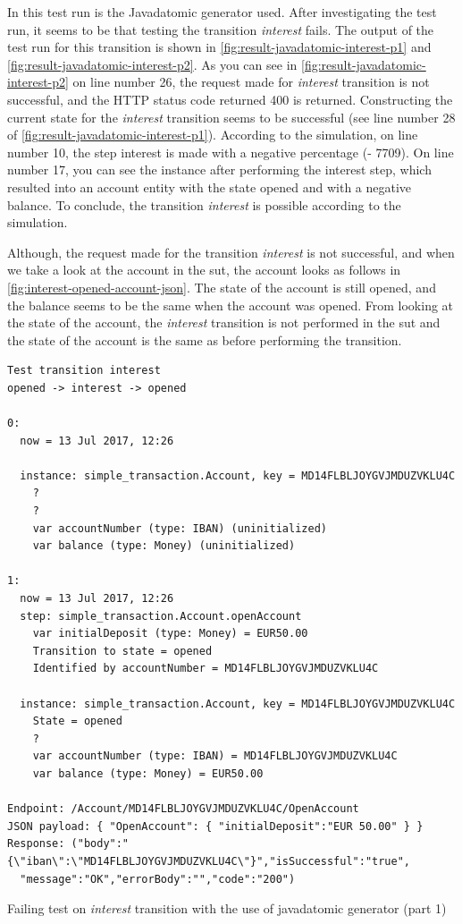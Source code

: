 In this test run is the Javadatomic generator used. After investigating the test
run, it seems to be that testing the transition \textit{interest} fails.
The output of the test run for this transition is shown in
\autoref{fig:result-javadatomic-interest-p1} and \autoref{fig:result-javadatomic-interest-p2}.
As you can see in \autoref{fig:result-javadatomic-interest-p2} on line number 26, the request made
for \textit{interest} transition is not successful, and the HTTP status code returned 400
is returned. Constructing the current state for the \textit{interest} transition seems to
be successful (see line number 28 of \autoref{fig:result-javadatomic-interest-p1}).
According to the simulation, on line number
10, the step interest is made with a negative percentage (- 7709). On line
number 17, you can see the instance after performing the interest step, which
resulted into an account entity with the state opened and with a negative
balance. To conclude, the transition \textit{interest} is possible according to the
simulation.

Although, the request made for the transition \textit{interest} is not
successful, and when we take a look at the account in the \gls{sut}, the account looks
as follows in \autoref{fig:interest-opened-account-json}. The state of the
account is still opened, and the balance seems to be the same when the account
was opened. From looking at the state of the account, the \textit{interest} transition
is not performed in the \gls{sut} and the state of the account is the same as before
performing the transition.


\begin{sourcecode}[h!]
\begin{lstlisting}[]
Test transition interest
opened -> interest -> opened

0:
  now = 13 Jul 2017, 12:26

  instance: simple_transaction.Account, key = MD14FLBLJOYGVJMDUZVKLU4C
    ?
    ?
    var accountNumber (type: IBAN) (uninitialized)
    var balance (type: Money) (uninitialized)

1:
  now = 13 Jul 2017, 12:26
  step: simple_transaction.Account.openAccount
    var initialDeposit (type: Money) = EUR50.00
    Transition to state = opened
    Identified by accountNumber = MD14FLBLJOYGVJMDUZVKLU4C

  instance: simple_transaction.Account, key = MD14FLBLJOYGVJMDUZVKLU4C
    State = opened
    ?
    var accountNumber (type: IBAN) = MD14FLBLJOYGVJMDUZVKLU4C
    var balance (type: Money) = EUR50.00

Endpoint: /Account/MD14FLBLJOYGVJMDUZVKLU4C/OpenAccount
JSON payload: { "OpenAccount": { "initialDeposit":"EUR 50.00" } }
Response: ("body":"{\"iban\":\"MD14FLBLJOYGVJMDUZVKLU4C\"}","isSuccessful":"true",
  "message":"OK","errorBody":"","code":"200")
\end{lstlisting}
\caption{Failing test on \textit{interest} transition with the use of javadatomic generator (part 1)}\label{fig:result-javadatomic-interest-p1}
\end{sourcecode}
\FloatBarrier

